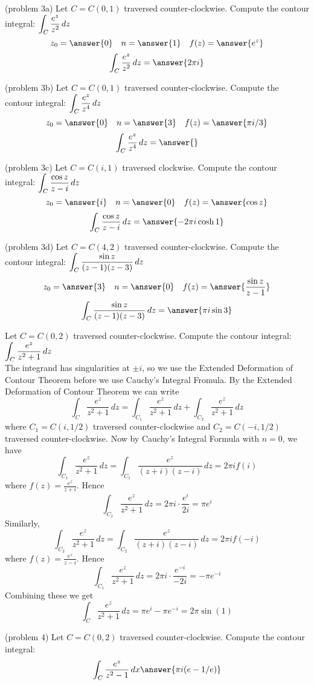 \documentclass[handout]{ximera}
\begin{document}
\begin{problem}(problem 3a)
Let $C = C(0, 1)$ traversed counter-clockwise. Compute the contour integral: $\displaystyle \int_C \frac{e^z}{z^2} \, dz$\\
\[
z_0 = \answer{0} \quad n = \answer{1} \quad f(z) = \answer{e^z}
\]
\[
\int_C \frac{e^z}{z^2} \, dz = \answer{2\pi i}
\]
\end{problem}
\begin{problem}(problem 3b)
Let $C = C(0, 1)$ traversed counter-clockwise. Compute the contour integral: $\displaystyle \int_C \frac{e^z}{z^4} \, dz$\\
\[
z_0 = \answer{0} \quad n = \answer{3} \quad f(z) = \answer{\pi i /3}
\]
\[
\int_C \frac{e^z}{z^4}\, dz = \answer{}
\]
\end{problem}
\begin{problem}(problem 3c)
Let $C = C(i, 1)$ traversed clockwise. Compute the contour integral: $\displaystyle \int_C \frac{\cos z}{z-i} \, dz$\\
\[
z_0 = \answer{i} \quad n = \answer{0} \quad f(z) = \answer{\cos z}
\]
\[
\int_C \frac{\cos z}{z-i}\, dz = \answer{-2\pi i \cosh 1}
\]
\end{problem}
\begin{problem}(problem 3d)
Let $C = C(4, 2)$ traversed counter-clockwise. Compute the contour integral: $\displaystyle \int_C \frac{\sin z}{(z-1)(z-3)} \, dz$\\
\[
z_0 = \answer{3} \quad n = \answer{0} \quad f(z) = \answer{\frac{\sin z}{z-1}}
\]
\[
\int_C \frac{\sin z}{(z-1)(z-3)} \, dz = \answer{\pi i \sin 3}
\]
\end{problem}

\begin{example}[example 4]
Let $C = C(0, 2)$ traversed counter-clockwise. Compute the contour integral: $\displaystyle \int_C \frac{e^z}{z^2 +1} \, dz$\\
The integrand has singularities at $\pm i$, so we use the Extended Deformation of Contour Theorem before we use Cauchy's Integral Fromula.
By the Extended Deformation of Contour Theorem we can write
\[
\int_C \frac{e^z}{z^2 +1} \, dz = \int_{C_1} \frac{e^z}{z^2 +1} \, dz +  \int_{C_2} \frac{e^z}{z^2 +1} \, dz 
\]
where $C_1 = C(i, 1/2)$ traversed counter-clockwise and $C_2 = C(-i, 1/2)$ traversed counter-clockwise.
Now by Cauchy's Integral Formula with $n = 0$, we have
\[
\int_{C_1} \frac{e^z}{z^2 +1} \, dz = \int_{C_1} \frac{e^z}{(z+i)(z-i)} \, dz = 2\pi i f(i)
\]
where $f(z) = \frac{e^z}{z+i}$.
Hence
\[
\int_{C_1} \frac{e^z}{z^2 +1} \, dz = 2\pi i \cdot \frac{e^i}{2i} = \pi e^i
\]
Similarly,
\[
\int_{C_2} \frac{e^z}{z^2 +1} \, dz = \int_{C_2} \frac{e^z}{(z+i)(z-i)} \, dz = 2\pi i f(-i)
\]
where $f(z) = \frac{e^z}{z-i}$.
Hence
\[
\int_{C_1} \frac{e^z}{z^2 +1} \, dz = 2\pi i \cdot \frac{e^{-i}}{-2i} = -\pi e^{-i}
\]
Combining these we get
\[
\int_C \frac{e^z}{z^2 +1} \, dz = \pi e^i - \pi e^{-i} = 2\pi \sin(1)
\]
\end{example}

\begin{problem}(problem 4)
Let $C = C(0, 2)$ traversed counter-clockwise. Compute the contour integral:\\
\[
\int_C \frac{e^z}{z^2 -1} \, dx  \answer{\pi i (e-1/e)}
\]
\end{problem}
\end{document}

